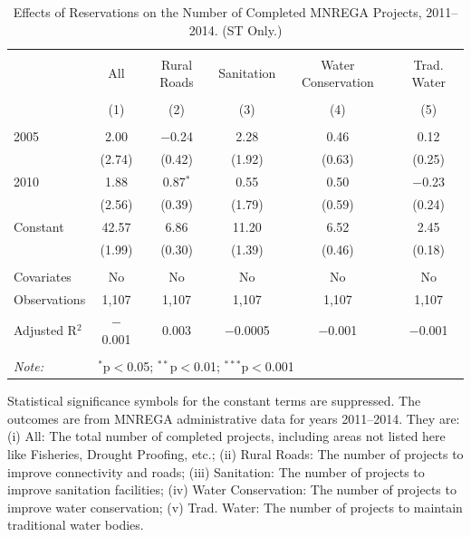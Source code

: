 \begin{table}[!htbp]
\centering
\begin{threeparttable}

  \caption{Effects of Reservations on the Number of Completed MNREGA Projects, 2011--2014. (ST Only.)} 
  \label{main_mnrega_phase_st} 
\scriptsize 
\begin{tabular}{@{\extracolsep{0pt}}lccccc} 
\\[-1.8ex]\hline 
\hline \\[-1.8ex] 
 & All & Rural Roads & Sanitation & Water Conservation & Trad. Water \\ 
\\[-1.8ex] & (1) & (2) & (3) & (4) & (5)\\ 
\hline \\[-1.8ex] 
 2005 & 2.00 & $-$0.24 & 2.28 & 0.46 & 0.12 \\ 
  & (2.74) & (0.42) & (1.92) & (0.63) & (0.25) \\ 
  2010 & 1.88 & 0.87$^{*}$ & 0.55 & 0.50 & $-$0.23 \\ 
  & (2.56) & (0.39) & (1.79) & (0.59) & (0.24) \\ 
  Constant & 42.57 & 6.86 & 11.20 & 6.52 & 2.45 \\ 
  & (1.99) & (0.30) & (1.39) & (0.46) & (0.18) \\ 
 \hline \\[-1.8ex] 
Covariates & No & No & No & No & No \\ 
Observations & 1,107 & 1,107 & 1,107 & 1,107 & 1,107 \\ 
Adjusted R$^{2}$ & $-$0.001 & 0.003 & $-$0.0005 & $-$0.001 & $-$0.001 \\ 
\hline 
\hline \\[-1.8ex] 
\textit{Note:}  & \multicolumn{5}{l}{$^{*}$p$<$0.05; $^{**}$p$<$0.01; $^{***}$p$<$0.001} \\ 
\end{tabular} 
\begin{tablenotes}[flushleft]
\scriptsize
\item[] Statistical significance symbols for the constant terms are suppressed. The outcomes are from MNREGA administrative data for years 2011--2014. They are: 
(i) All: The total number of completed projects, including areas not listed here like Fisheries, Drought Proofing, etc.;
(ii) Rural Roads: The number of projects to improve connectivity and roads;
(iii) Sanitation: The number of projects to improve sanitation facilities;
(iv) Water Conservation: The number of projects to improve water conservation;
(v) Trad. Water: The number of projects to maintain traditional water bodies.
\end{tablenotes}
\end{threeparttable}
\end{table}
